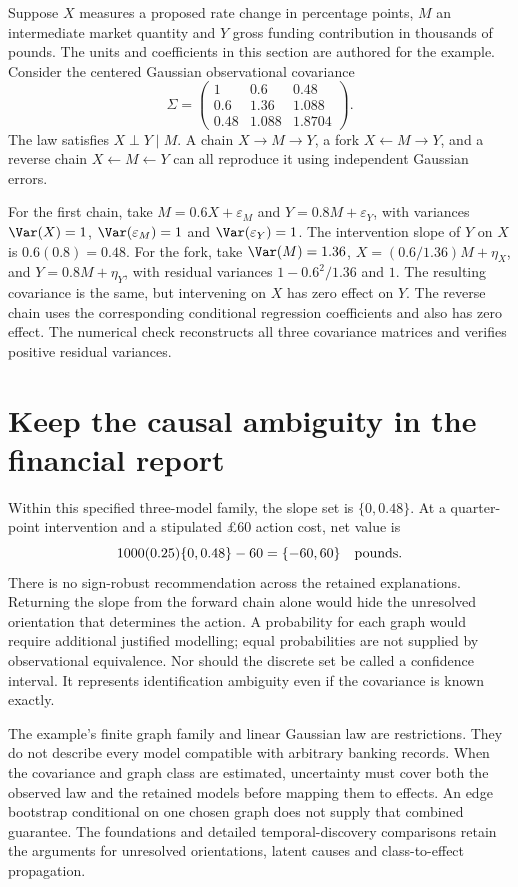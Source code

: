 Suppose $X$ measures a proposed rate change in percentage points, $M$ an
intermediate market quantity and $Y$ gross funding contribution in thousands
of pounds. The units and coefficients in this section are authored for the
example. Consider the centered Gaussian observational covariance
\[
 \Sigma=\begin{pmatrix}
 1&0.6&0.48\\0.6&1.36&1.088\\0.48&1.088&1.8704
 \end{pmatrix}.
\]
The law satisfies $X\perp Y\mid M$. A chain $X\to M\to Y$, a
fork $X\leftarrow M\to Y$, and a reverse chain $X\leftarrow M\leftarrow Y$
can all reproduce it using independent Gaussian errors.

For the first chain, take $M=0.6X+\varepsilon_M$ and
$Y=0.8M+\varepsilon_Y$, with variances $\Var(X)=1$,
$\Var(\varepsilon_M)=1$ and $\Var(\varepsilon_Y)=1$. The intervention
slope of $Y$ on $X$ is $0.6(0.8)=0.48$. For the fork, take
$\Var(M)=1.36$, $X=(0.6/1.36)M+\eta_X$, and $Y=0.8M+\eta_Y$,
with residual variances $1-0.6^2/1.36$ and $1$. The resulting covariance
is the same, but intervening on $X$ has zero effect on $Y$. The reverse
chain uses the corresponding conditional regression coefficients and also
has zero effect. The numerical check reconstructs all three covariance
matrices and verifies positive residual variances.

\section{Keep the causal ambiguity in the financial report}
Within this specified three-model family, the slope set is $\{0,0.48\}$.
At a quarter-point intervention and a stipulated \pounds60 action cost,
net value is
\[
 1000(0.25)\{0,0.48\}-60=\{-60,60\}
 \quad\hbox{pounds}.
\]
There is no sign-robust recommendation across the retained explanations.
Returning the slope from the forward chain alone would hide the unresolved
orientation that determines the action. A probability for each graph would
require additional justified modelling; equal probabilities are not supplied
by observational equivalence. Nor should the discrete set be called a
confidence interval. It represents identification ambiguity even if the
covariance is known exactly.

The example's finite graph family and linear Gaussian law are restrictions.
They do not describe every model compatible with arbitrary banking records.
When the covariance and graph class are estimated, uncertainty must cover
both the observed law and the retained models before mapping them to effects.
An edge bootstrap conditional on one chosen graph does not supply that
combined guarantee. The foundations and detailed temporal-discovery
comparisons retain the arguments for unresolved orientations, latent causes
and class-to-effect propagation.

